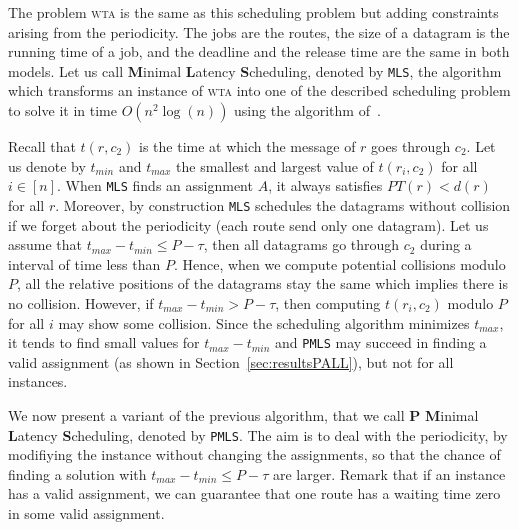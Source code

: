 \documentclass[a4paper,10pt]{article}
\newcommand\MLS{\texttt{MLS}\xspace}
\newcommand\PMLS{\texttt{PMLS}\xspace}
\newcommand\wta{\textsc{wta}\xspace}
\begin{document}
     The problem \wta is the same as this scheduling problem but adding constraints arising from
     the periodicity. The jobs are the routes, the size of a datagram is the running time of a job, 
     and the deadline and the release time are the same in both models.
	 Let us call \textbf{M}inimal \textbf{L}atency \textbf{S}cheduling, denoted by \MLS, the algorithm which transforms an instance of \wta into one of the described scheduling problem to solve it in time $O(n^2\log(n))$ using the algorithm of~\cite{simons1978fast}.
     

    
     Recall that $t(r,c_2)$ is the time at which the message of $r$ goes through $c_2$. Let us denote by $t_{min}$ and $t_{max}$ the smallest and largest value of $t(r_i,c_2)$ for all $i \in[n]$. When \MLS finds an assignment $A$, it always satisfies $PT(r) < d(r)$ for all $r$. Moreover, by construction \MLS schedules the datagrams without collision if we forget about the periodicity (each route send only one datagram). Let us assume that $t_{max}- t_{min} \leq P -\tau $, then all datagrams go through $c_2$ during a interval of time less than $P$. Hence, when we compute potential collisions modulo $P$, all the relative positions of the datagrams stay the same which implies there is no collision. However, if $t_{max}- t_{min} > P -\tau $, then computing $t(r_i,c_2)$ modulo $P$ for all $i$ may show some collision. Since the scheduling algorithm minimizes $t_{max}$, it tends to find  small values for $t_{max} - t_{min}$ and \PMLS may succeed in finding a valid assignment (as shown in Section~\ref{sec:resultsPALL}), but not for all instances. 
     
     We now present a variant of the previous algorithm, that we call
     \textbf{P} \textbf{M}inimal \textbf{L}atency \textbf{S}cheduling, denoted by \PMLS. The aim is to deal with the periodicity, by modifiying the instance without changing the assignments, so that the chance of finding a solution with $t_{max}- t_{min} \leq P -\tau $ are larger.  Remark that if an instance has a valid assignment, we can guarantee that one route has a waiting time zero in some valid assignment. 
     
\end{document}
